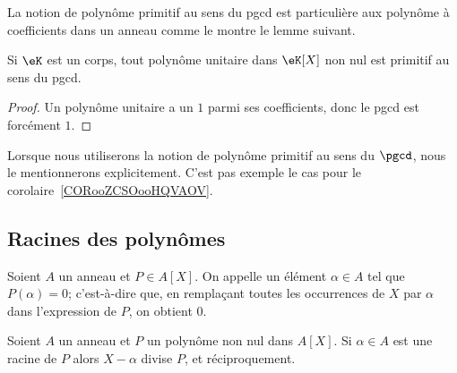 La notion de polynôme primitif au sens du pgcd est particulière aux polynôme à coefficients dans un anneau comme le montre le lemme suivant.

\begin{lemma}
    Si \( \eK\) est un corps, tout polynôme unitaire dans \( \eK[X]\) non nul est primitif au sens du pgcd.
\end{lemma}

\begin{proof}
    Un polynôme unitaire a un \( 1\) parmi ses coefficients, donc le pgcd est forcément \( 1\).
\end{proof}

Lorsque nous utiliserons la notion de polynôme primitif au sens du \( \pgcd\), nous le mentionnerons explicitement. C'est pas exemple le cas pour le corolaire~\ref{CORooZCSOooHQVAOV}.

\subsection{Racines des polynômes}

\begin{definition}
  Soient \( A \) un anneau et \( P \in A[X] \). On appelle
   un élément \( \alpha \in A \)
  tel que \( P(\alpha) = 0 \); c'est-à-dire que, en remplaçant toutes
  les occurrences de $X$ par $\alpha$ dans l'expression de $P$, on
  obtient $0$.
\end{definition}

\begin{proposition} \label{PropHSQooASRbeA}
    Soient \( A\) un anneau et \( P\) un polynôme non nul dans \( A[X]\). Si \( \alpha\in A\) est une racine de \( P\) alors \( X-\alpha\) divise \( P\), et réciproquement.
\end{proposition}

